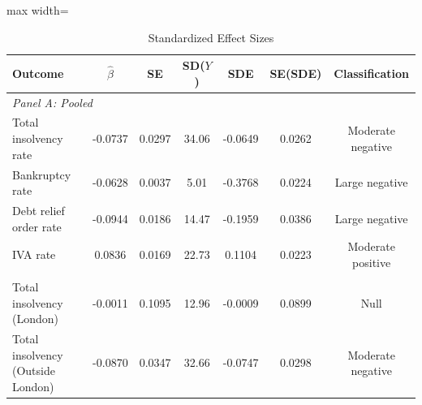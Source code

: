 \begin{table}[htbp]
\centering
\caption{Standardized Effect Sizes}
\label{tab:sde}
\footnotesize
\begin{adjustbox}{max width=\textwidth}
\begin{tabular}{lcccccc}
\hline\hline
Outcome & $\hat{\beta}$ & SE & SD($Y$) & SDE & SE(SDE) & Classification \\
\hline
\multicolumn{7}{l}{\textit{Panel A: Pooled}} \\
Total insolvency rate & -0.0737 & 0.0297 & 34.06 & -0.0649 & 0.0262 & Moderate negative \\
Bankruptcy rate & -0.0628 & 0.0037 & 5.01 & -0.3768 & 0.0224 & Large negative \\
Debt relief order rate & -0.0944 & 0.0186 & 14.47 & -0.1959 & 0.0386 & Large negative \\
IVA rate & 0.0836 & 0.0169 & 22.73 & 0.1104 & 0.0223 & Moderate positive \\
\addlinespace
\multicolumn{7}{l}{\textit{Panel B: Heterogeneous}} \\
Total insolvency (London) & -0.0011 & 0.1095 & 12.96 & -0.0009 & 0.0899 & Null \\
Total insolvency (Outside London) & -0.0870 & 0.0347 & 32.66 & -0.0747 & 0.0298 & Moderate negative \\
\hline\hline
\end{tabular}
\end{adjustbox}
\par\vspace{0.3em}

\end{table}
